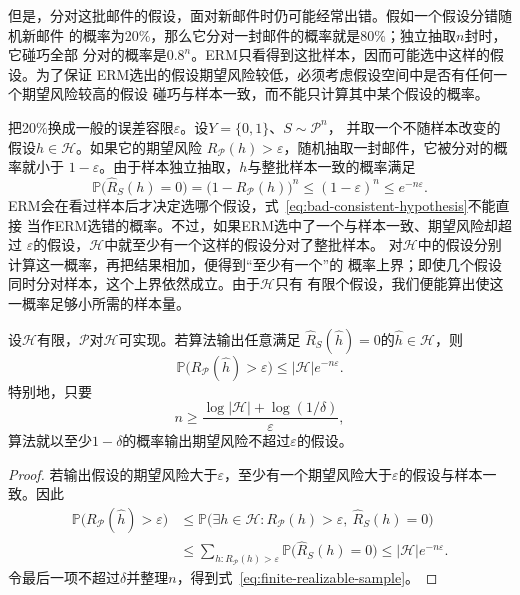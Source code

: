 但是，分对这批邮件的假设，面对新邮件时仍可能经常出错。假如一个假设分错随机新邮件
的概率为20\%，那么它分对一封邮件的概率就是80\%；独立抽取$n$封时，它碰巧全部
分对的概率是$0.8^n$。ERM只看得到这批样本，因而可能选中这样的假设。为了保证
ERM选出的假设期望风险较低，必须考虑假设空间中是否有任何一个期望风险较高的假设
碰巧与样本一致，而不能只计算其中某个假设的概率。

把20\%换成一般的误差容限$\varepsilon$。设$Y=\{0,1\}$、$S\sim\mathcal P^n$，
并取一个不随样本改变的假设$h\in\mathcal H$。如果它的期望风险
$R_{\mathcal P}(h)>\varepsilon$，随机抽取一封邮件，它被分对的概率就小于
$1-\varepsilon$。由于样本独立抽取，$h$与整批样本一致的概率满足
\begin{equation}
  \mathbb P\bigl(\hat R_S(h)=0\bigr)
  =\bigl(1-R_{\mathcal P}(h)\bigr)^n
  \leq(1-\varepsilon)^n\leq e^{-n\varepsilon}.
  \label{eq:bad-consistent-hypothesis}
\end{equation}
ERM会在看过样本后才决定选哪个假设，式~\eqref{eq:bad-consistent-hypothesis}不能直接
当作ERM选错的概率。不过，如果ERM选中了一个与样本一致、期望风险却超过
$\varepsilon$的假设，$\mathcal H$中就至少有一个这样的假设分对了整批样本。
对$\mathcal H$中的假设分别计算这一概率，再把结果相加，便得到“至少有一个”的
概率上界；即使几个假设同时分对样本，这个上界依然成立。由于$\mathcal H$只有
有限个假设，我们便能算出使这一概率足够小所需的样本量。

\begin{theorem}[有限假设空间的可实现PAC样本量界]
\label{thm:finite-realizable-pac}
设$\mathcal H$有限，$\mathcal P$对$\mathcal H$可实现。若算法输出任意满足
$\hat R_S(\hat h)=0$的$\hat h\in\mathcal H$，则
\begin{equation}
  \mathbb P\bigl(R_{\mathcal P}(\hat h)>\varepsilon\bigr)
  \leq |\mathcal H|e^{-n\varepsilon}.
  \label{eq:finite-realizable-failure}
\end{equation}
特别地，只要
\begin{equation}
  n\geq\frac{\log|\mathcal H|+\log(1/\delta)}{\varepsilon},
  \label{eq:finite-realizable-sample}
\end{equation}
算法就以至少$1-\delta$的概率输出期望风险不超过$\varepsilon$的假设。
\end{theorem}

\begin{proof}
若输出假设的期望风险大于$\varepsilon$，至少有一个期望风险大于$\varepsilon$的假设与样本一致。因此
\begin{align*}
 \mathbb P\bigl(R_{\mathcal P}(\hat h)>\varepsilon\bigr)
 &\leq \mathbb P\bigl(\exists h\in\mathcal H:
       R_{\mathcal P}(h)>\varepsilon,\ \hat R_S(h)=0\bigr)\\
 &\leq\sum_{h:R_{\mathcal P}(h)>\varepsilon}
       \mathbb P\bigl(\hat R_S(h)=0\bigr)
 \leq |\mathcal H|e^{-n\varepsilon}.
\end{align*}
令最后一项不超过$\delta$并整理$n$，得到式~\eqref{eq:finite-realizable-sample}。
\end{proof}

